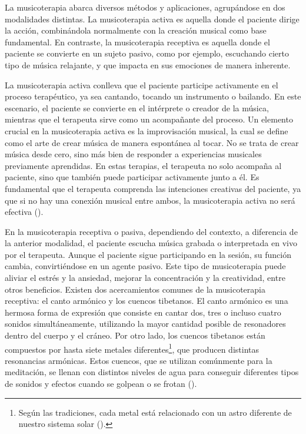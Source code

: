 La musicoterapia abarca diversos métodos y aplicaciones, agrupándose en dos modalidades distintas. La musicoterapia activa es aquella donde el paciente dirige la acción, combinándola normalmente con la creación musical como base fundamental. En contraste, la musicoterapia receptiva es aquella donde el paciente se convierte en un sujeto pasivo, como por ejemplo, escuchando cierto tipo de música relajante, y que impacta en sus emociones de manera inherente.

La musicoterapia activa conlleva que el paciente participe activamente en el proceso terapéutico, ya sea cantando, tocando un instrumento o bailando. En este escenario, el paciente se convierte en el intérprete o creador de la música, mientras que el terapeuta sirve como un acompañante del proceso. Un elemento crucial en la musicoterapia activa es la improvisación musical, la cual se define como el arte de crear música de manera espontánea al tocar. No se trata de crear música desde cero, sino más bien de responder a experiencias musicales previamente aprendidas. En estas terapias, el terapeuta no solo acompaña al paciente, sino que también puede participar activamente junto a él. Es fundamental que el terapeuta comprenda las intenciones creativas del paciente, ya que si no hay una conexión musical entre ambos, la musicoterapia activa no será efectiva (\cite{SALAMANCA:2003}).

En la musicoterapia receptiva o pasiva, dependiendo del contexto, a diferencia de la anterior modalidad, el paciente escucha música grabada o interpretada en vivo por el terapeuta. Aunque el paciente sigue participando en la sesión, su función cambia, convirtiéndose en un agente pasivo. Este tipo de musicoterapia puede aliviar el estrés y la ansiedad, mejorar la concentración y la creatividad, entre otros beneficios. Existen dos acercamientos comunes de la musicoterapia receptiva: el canto armónico y los cuencos tibetanos. El canto armónico es una hermosa forma de expresión que consiste en cantar dos, tres o incluso cuatro sonidos simultáneamente, utilizando la mayor cantidad posible de resonadores dentro del cuerpo y el cráneo. Por otro lado, los cuencos tibetanos están compuestos por hasta siete metales diferentes\footnote{Según las tradiciones, cada metal está relacionado con un astro diferente de nuestro sistema solar (\cite{SALAMANCA:2003}).}, que producen distintas resonancias armónicas. Estos cuencos, que se utilizan comúnmente para la meditación, se llenan con distintos niveles de agua para conseguir diferentes tipos de sonidos y efectos cuando se golpean o se frotan (\cite{SALAMANCA:2003}).

